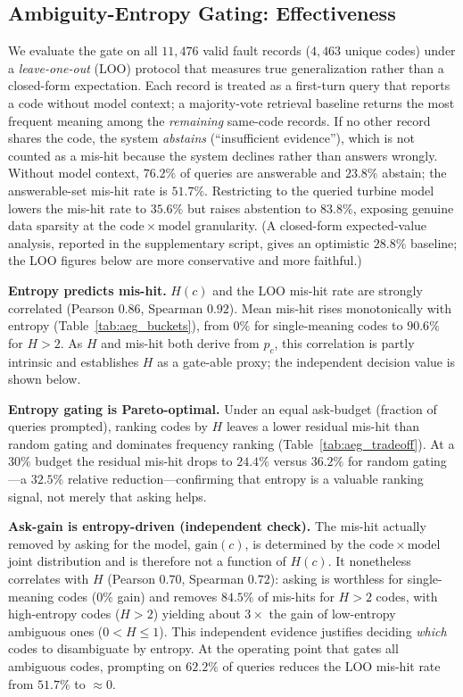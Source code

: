 \subsection{Ambiguity-Entropy Gating: Effectiveness}
\label{sec:aeg_eval}
We evaluate the gate on all $11{,}476$ valid fault records ($4{,}463$ unique codes) under a \emph{leave-one-out} (LOO) protocol that measures true generalization rather than a closed-form expectation. Each record is treated as a first-turn query that reports a code without model context; a majority-vote retrieval baseline returns the most frequent meaning among the \emph{remaining} same-code records. If no other record shares the code, the system \emph{abstains} (``insufficient evidence''), which is not counted as a mis-hit because the system declines rather than answers wrongly. Without model context, $76.2\%$ of queries are answerable and $23.8\%$ abstain; the answerable-set mis-hit rate is $51.7\%$. Restricting to the queried turbine model lowers the mis-hit rate to $35.6\%$ but raises abstention to $83.8\%$, exposing genuine data sparsity at the $\mathrm{code}\times\mathrm{model}$ granularity. (A closed-form expected-value analysis, reported in the supplementary script, gives an optimistic $28.8\%$ baseline; the LOO figures below are more conservative and more faithful.)

\noindent\textbf{Entropy predicts mis-hit.}
$H(c)$ and the LOO mis-hit rate are strongly correlated (Pearson $0.86$, Spearman $0.92$). Mean mis-hit rises monotonically with entropy (Table~\ref{tab:aeg_buckets}), from $0\%$ for single-meaning codes to $90.6\%$ for $H>2$. As $H$ and mis-hit both derive from $p_c$, this correlation is partly intrinsic and establishes $H$ as a gate-able proxy; the independent decision value is shown below.

\noindent\textbf{Entropy gating is Pareto-optimal.}
Under an equal ask-budget (fraction of queries prompted), ranking codes by $H$ leaves a lower residual mis-hit than random gating and dominates frequency ranking (Table~\ref{tab:aeg_tradeoff}). At a $30\%$ budget the residual mis-hit drops to $24.4\%$ versus $36.2\%$ for random gating---a $32.5\%$ relative reduction---confirming that entropy is a valuable ranking signal, not merely that asking helps.

\noindent\textbf{Ask-gain is entropy-driven (independent check).}
The mis-hit actually removed by asking for the model, $\mathrm{gain}(c)$, is determined by the $\mathrm{code}\times\mathrm{model}$ joint distribution and is therefore not a function of $H(c)$. It nonetheless correlates with $H$ (Pearson $0.70$, Spearman $0.72$): asking is worthless for single-meaning codes ($0\%$ gain) and removes $84.5\%$ of mis-hits for $H>2$ codes, with high-entropy codes ($H>2$) yielding about $3\times$ the gain of low-entropy ambiguous ones ($0<H\le1$). This independent evidence justifies deciding \emph{which} codes to disambiguate by entropy. At the operating point that gates all ambiguous codes, prompting on $62.2\%$ of queries reduces the LOO mis-hit rate from $51.7\%$ to $\approx 0$.

